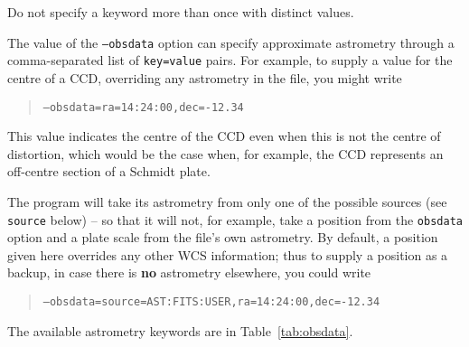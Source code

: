 \documentclass[twoside,11pt]{article}
\begin{document}
Do not specify a keyword more than once with distinct values.

The value of the \texttt{--obsdata} option can specify approximate astrometry
through a comma-separated list of \texttt{key=value} pairs.  For example, to
supply a value for the centre of a CCD, overriding any astrometry in the file,
you might write
\begin{quote}
  \texttt{--obsdata=ra=14:24:00,dec=-12.34}
\end{quote}
This value indicates the centre of the CCD even when this is not the centre of
distortion, which would be the case when, for example, the CCD represents an
off-centre section of a Schmidt plate.
          
The program will take its astrometry from only one of the possible sources
(see \texttt{source} below) -- so that it will not, for example, take a
position from the \texttt{obsdata} option and a plate scale from the file's
own astrometry.  By default, a position given here overrides any other WCS
information; thus to supply a position as a backup, in case there is
\textbf{no} astrometry elsewhere, you could write
\begin{quote}
  \texttt{--obsdata=source=AST:FITS:USER,ra=14:24:00,dec=-12.34}
\end{quote}
The available astrometry keywords are in Table~\ref{tab:obsdata}.
\end{document}

